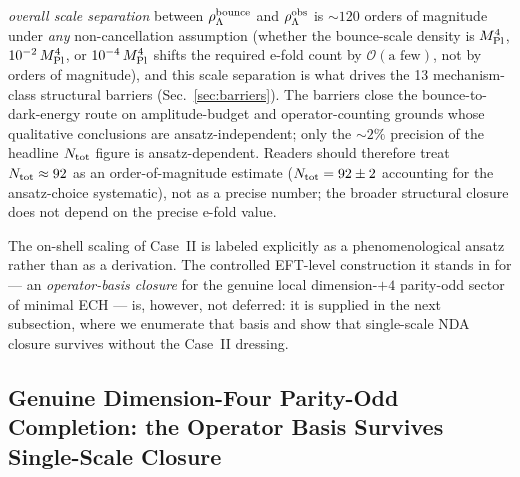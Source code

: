 \documentclass[aps,prd,twocolumn,superscriptaddress,showpacs,preprintnumbers,nofootinbib,longbibliography,floatfix]{revtex4-2}
\newcommand{\MPl}{M_{\rm Pl}}
\begin{document}
\emph{overall scale separation} between $\rho_\Lambda^{\rm bounce}$ and
$\rho_\Lambda^{\rm obs}$ is ${\sim}120$ orders of magnitude under
\emph{any} non-cancellation assumption (whether the bounce-scale density
is $\MPl^4$, $10^{-2}\,\MPl^4$, or $10^{-4}\,\MPl^4$ shifts the required
e-fold count by $\mathcal{O}(\text{a few})$, not by orders of magnitude),
and this scale separation is what drives the 13 mechanism-class
structural barriers (Sec.~\ref{sec:barriers}). The barriers close the
bounce-to-dark-energy route on amplitude-budget and operator-counting
grounds whose qualitative conclusions are ansatz-independent; only the
${\sim}2\%$ precision of the headline $N_{\rm tot}$ figure is
ansatz-dependent. Readers should therefore treat
$N_{\rm tot} \approx 92$ as an order-of-magnitude estimate
($N_{\rm tot} = 92\pm 2$ accounting for the ansatz-choice systematic),
not as a precise number; the broader structural closure does not depend
on the precise e-fold value.
\par
The on-shell scaling of Case~II is labeled explicitly as a
phenomenological ansatz rather than as a derivation. The controlled
EFT-level construction it stands in for --- an \emph{operator-basis
closure} for the genuine local dimension-$+4$ parity-odd sector of
minimal ECH --- is, however, not deferred: it is supplied in the next
subsection, where we enumerate that basis and show that single-scale
NDA closure survives without the Case~II dressing.

\subsection{Genuine Dimension-Four Parity-Odd Completion: the Operator
Basis Survives Single-Scale Closure}\label{app:dim4_completion}
\end{document}

